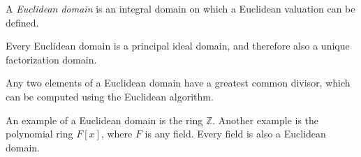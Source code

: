 \documentclass[12pt]{article}
\newcommand{\Z}{\mathbb{Z}}
\begin{document}

A \emph{Euclidean domain} is an integral domain
on which a Euclidean valuation can be defined.

Every Euclidean domain is a principal ideal domain,
and therefore also a unique factorization domain.

Any two elements of a Euclidean domain have a greatest common divisor,
which can be computed using the Euclidean algorithm.

An example of a Euclidean domain is the ring $\Z$.
Another example is the polynomial ring $F[x]$, where $F$ is any field.
Every field is also a Euclidean domain.
\end{document}
